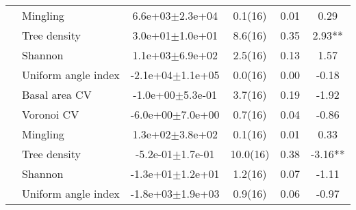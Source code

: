 {\begin{longtable}{llcccS[table-format=-2.2, table-space-text-post = {***}]}
   & Mingling &  6.6e+03$\pm$2.3e+04 & 0.1(16) & 0.01 & 0.29 \\* 
   & Tree density &  3.0e+01$\pm$1.0e+01 & 8.6(16) & 0.35 & 2.93** \\* 
   & Shannon &  1.1e+03$\pm$6.9e+02 & 2.5(16) & 0.13 & 1.57 \\* 
   & Uniform angle index & -2.1e+04$\pm$1.1e+05 & 0.0(16) & 0.00 & -0.18 \\ 
   \midrule
{} & Basal area CV & -1.0e+00$\pm$5.3e-01 & 3.7(16) & 0.19 & -1.92 \\* 
   & Voronoi CV & -6.0e+00$\pm$7.0e+00 & 0.7(16) & 0.04 & -0.86 \\* 
   & Mingling &  1.3e+02$\pm$3.8e+02 & 0.1(16) & 0.01 & 0.33 \\* 
   & Tree density & -5.2e-01$\pm$1.7e-01 & 10.0(16) & 0.38 & -3.16** \\* 
   & Shannon & -1.3e+01$\pm$1.2e+01 & 1.2(16) & 0.07 & -1.11 \\* 
   & Uniform angle index & -1.8e+03$\pm$1.9e+03 & 0.9(16) & 0.06 & -0.97 \\ 
   \bottomrule
\end{longtable}
}

